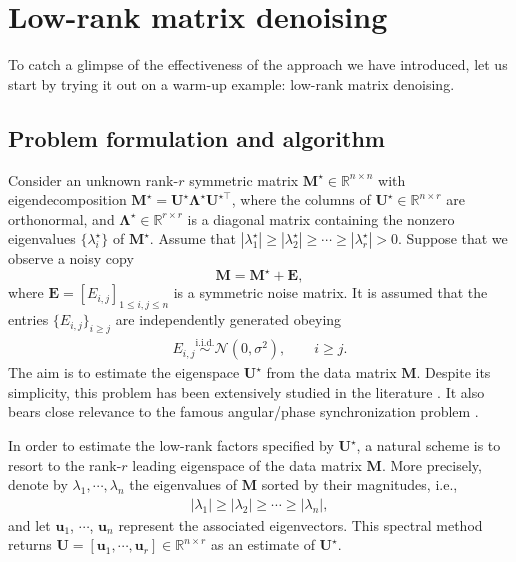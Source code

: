
\section{Low-rank matrix denoising}
\label{sec:matrix-denoising-L2}

To catch a glimpse of the effectiveness of the approach we have introduced,
let us start by trying it out on a warm-up example: low-rank matrix denoising.

\subsection{Problem formulation and algorithm}\label{sec:matrix-denoising-setup}  Consider an unknown rank-$r$ symmetric matrix $\bm{M}^{\star} \in \mathbb{R}^{n\times n}$ with eigendecomposition $\bm{M}^{\star}=\bm{U}^{\star}\bm{\Lambda}^{\star}\bm{U}^{\star\top}$, where the columns of $\bm{U}^{\star}\in \mathbb{R}^{n\times r}$ are orthonormal, and $\bm{\Lambda}^{\star}\in \mathbb{R}^{r\times r}$ is a diagonal matrix containing the nonzero eigenvalues $\{\lambda_{i}^{\star}\}$ of $\bm{M}^{\star}$. Assume that $|\lambda_1^{\star}|\geq |\lambda_2^{\star}|\geq \cdots \geq |\lambda_r^{\star}|>0$.  Suppose that  we observe a noisy copy
\[
\bm{M}=\bm{M}^{\star}+\bm{E},
\]
 where $\bm{E}=[E_{i,j}]_{1\leq i,j\leq n}$ is a symmetric noise matrix. It is assumed that the entries $\{{E}_{i,j}\}_{i\geq j}$ are independently generated obeying
%
\begin{align}
	E_{i,j} \overset{\mathrm{i.i.d.}}{\sim} \mathcal{N}(0,\sigma^2) , \qquad i\geq j.
\end{align}
%
The aim is to estimate the eigenspace $\bm{U}^{\star}$ from the data matrix $\bm{M}$. Despite its simplicity, this problem  has been extensively studied in the literature \citep{koltchinskii2016perturbation,bao2018singular,ding2020high,xia2019normal,li2021minimax}. It also  bears close relevance to the famous angular/phase synchronization problem \citep{singer2011angular,bandeira2017tightness}.


In order to estimate the low-rank factors specified by $\bm{U}^{\star}$, a natural scheme is to resort to the rank-$r$ leading eigenspace of the data matrix $\bm{M}$.  More precisely, denote by $\lambda_1,\cdots,\lambda_n$ the eigenvalues of $\bm{M}$ sorted by their magnitudes, i.e.,
%
\begin{align}
	|\lambda_1| \geq |\lambda_2| \geq \cdots \geq |\lambda_n|,
\end{align}
%
and let $\bm{u}_1$, $\cdots$, $\bm{u}_n$ represent the associated eigenvectors.
This spectral method returns  $\bm{U} = [\bm{u}_1,\cdots,\bm{u}_r]\in \mathbb{R}^{n\times r}$ as an estimate of $\bm{U}^{\star}$.


